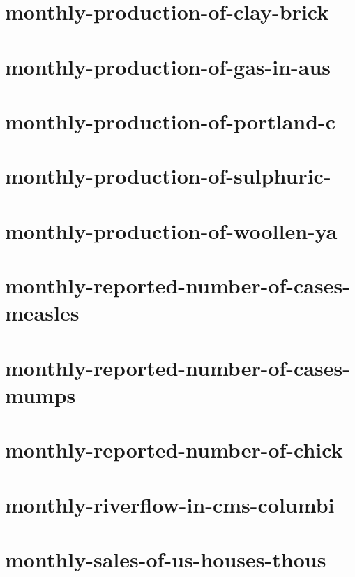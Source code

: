 \documentclass[twoside]{article}
\begin{document}
    

\section{monthly-production-of-clay-brick}

    

\section{monthly-production-of-gas-in-aus}

    

\section{monthly-production-of-portland-c}

    

\section{monthly-production-of-sulphuric-}

    

\section{monthly-production-of-woollen-ya}

    

\section{monthly-reported-number-of-cases-measles}

    

\section{monthly-reported-number-of-cases-mumps}

    

\section{monthly-reported-number-of-chick}

    

\section{monthly-riverflow-in-cms-columbi}

    

\section{monthly-sales-of-us-houses-thous}

    
\end{document}
